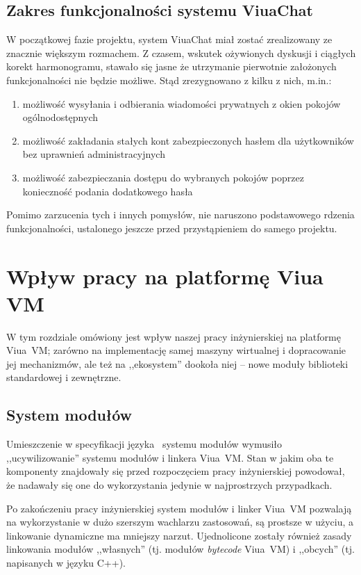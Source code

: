 \subsection{Zakres funkcjonalności systemu ViuaChat}

W początkowej fazie projektu, system ViuaChat miał zostać zrealizowany ze
znacznie większym rozmachem. Z czasem, wskutek ożywionych dyskusji i ciągłych
korekt harmonogramu, stawało się jasne że utrzymanie pierwotnie założonych
funkcjonalności nie będzie możliwe. Stąd zrezygnowano z kilku z nich, m.in.:

\begin{enumerate}
    \item możliwość wysyłania i odbierania wiadomości prywatnych z okien pokojów
        ogólnodostępnych
    \item możliwość zakładania stałych kont zabezpieczonych hasłem dla
        użytkowników bez uprawnień administracyjnych
    \item możliwość zabezpieczania dostępu do wybranych pokojów poprzez
        konieczność podania dodatkowego hasła
\end{enumerate}

Pomimo zarzucenia tych i innych pomysłów, nie naruszono podstawowego rdzenia
funkcjonalności, ustalonego jeszcze przed przystąpieniem do samego projektu.

\section{Wpływ pracy na platformę Viua VM}

W tym rozdziale omówiony jest wpływ naszej pracy inżynierskiej na platformę
Viua~VM; zarówno na implementację samej maszyny wirtualnej i dopracowanie jej
mechanizmów, ale też na ,,ekosystem'' dookoła niej -- nowe moduły biblioteki
standardowej i zewnętrzne.

\subsection{System modułów}

Umieszczenie w specyfikacji języka \ViuAct\ systemu modułów wymusiło
,,ucywilizowanie'' systemu modułów i linkera Viua~VM. Stan w jakim oba te
komponenty znajdowały się przed rozpoczęciem pracy inżynierskiej powodował, że
nadawały się one do wykorzystania jedynie w najprostrzych przypadkach.

Po zakończeniu pracy inżynierskiej system modułów i linker Viua~VM pozwalają na
wykorzystanie w dużo szerszym wachlarzu zastosowań, są prostsze w użyciu, a
linkowanie dynamiczne ma mniejszy narzut. Ujednolicone zostały również zasady
linkowania modułów ,,własnych'' (tj. modułów \emph{bytecode} Viua~VM) i
,,obcych'' (tj. napisanych w języku C++).

